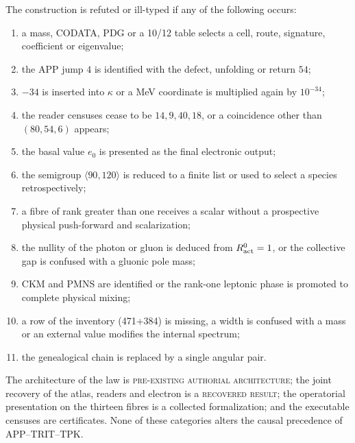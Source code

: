 \begin{falsifier}
\label{10j-falsador-ley-masas}
The construction is refuted or ill-typed if any of the following occurs:
\begin{enumerate}
 \item a mass, CODATA, PDG or a 10/12 table selects a cell, route, signature, coefficient or eigenvalue;
 \item the APP jump \(4\) is identified with the defect, unfolding or return \(54\);
 \item \(-34\) is inserted into \(\kappa\) or a MeV coordinate is multiplied again by \(10^{-34}\);
 \item the reader censuses cease to be \(14,9,40,18\), or a coincidence other than \((80,54,6)\) appears;
 \item the basal value \(e_0\) is presented as the final electronic output;
 \item the semigroup \(\langle90,120\rangle\) is reduced to a finite list or used to select a species retrospectively;
 \item a fibre of rank greater than one receives a scalar without a prospective physical push-forward and scalarization;
 \item the nullity of the photon or gluon is deduced from \(R_{\rm act}^{0}=1\), or the collective gap is confused with a gluonic pole mass;
 \item CKM and PMNS are identified or the rank-one leptonic phase is promoted to complete physical mixing;
 \item a row of the inventory (471+384) is missing, a width is confused with a mass or an external value modifies the internal spectrum;
 \item the genealogical chain is replaced by a single angular pair.
\end{enumerate}
\end{falsifier}

The architecture of the law is \textsc{pre-existing authorial architecture}; the joint recovery of the atlas, readers and electron is a \textsc{recovered result}; the operatorial presentation on the thirteen fibres is a collected formalization; and the executable censuses are certificates. None of these categories alters the causal precedence of APP--TRIT--TPK.
